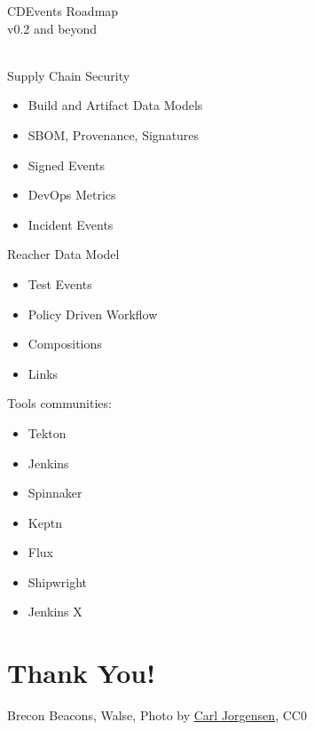 \documentclass[aspectratio=169,11pt,hyperref={colorlinks=true}]{beamer}
\begin{document}
\begin{stripedframe}%
  {%
  CDEvents Roadmap \\
  v0.2 and beyond \\
  ~
  }%
  {%
  Supply Chain Security
  \begin{itemize}
    \item Build and Artifact Data Models
    \item SBOM, Provenance, Signatures
  \end{itemize}
  \begin{itemize}
    \item Signed Events
  \end{itemize}
  }%
  {%
  \begin{itemize}
    \item DevOps Metrics
    \item Incident Events
  \end{itemize}
  }%
  {%
  Reacher Data Model
  \begin{itemize}
    \item Test Events
    \item Policy Driven Workflow
    \item Compositions
    \item Links
  \end{itemize}
  }%
  {%
  Tools communities:
  \begin{itemize}
    \item Tekton
    \item Jenkins
    \item Spinnaker
    \item Keptn
    \item Flux
    \item Shipwright
    \item Jenkins X
  \end{itemize}
  }%
\end{stripedframe}

\section[Thank You]{Thank You!}

\begin{sectionwithpiclargecentral}{Brecon Beacons, Walse, Photo by \href{https://unsplash.com/@scamartist}{\underline{Carl Jorgensen}}, CC0}
\end{sectionwithpiclargecentral}
\end{document}

